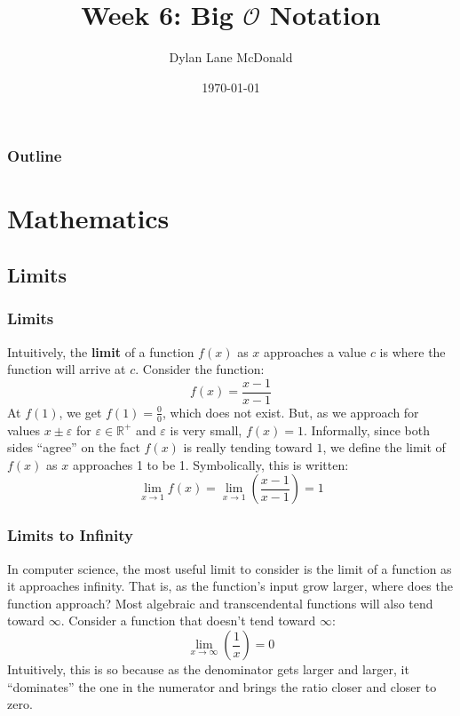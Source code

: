 \documentclass[aspectratio=169]{beamer}
\title{Week 6: Big $\mathcal{O}$ Notation}
\author{Dylan Lane McDonald}
\institute{CNM STEMulus Center\\Web Development with PHP}
\date{\today}
\begin{document}
\lstset{language=Java}
\begin{frame}
\titlepage
\end{frame}

\begin{frame}
\frametitle{Outline}
\tableofcontents
\end{frame}

\section{Mathematics}
\subsection{Limits}
\begin{frame}
\frametitle{Limits}
Intuitively, the \textbf{limit} of a function $f(x)$ as $x$ approaches a value $c$ is where the function will arrive at $c$. Consider the function:
\begin{equation}
f(x) = \frac {x - 1}{x - 1}
\label{eqn:ratio}
\end{equation}
At $f(1)$, we get $f(1) = \frac 00$, which does not exist. But, as we approach for values $x \pm \varepsilon$ for $\varepsilon \in \mathbb{R}^+$ and $\varepsilon$ is very small, $f(x) = 1$. Informally, since both sides ``agree'' on the fact $f(x)$ is really tending toward $1$, we define the limit of $f(x)$ as $x$ approaches 1 to be 1. Symbolically, this is written:
\[
\lim_{x \rightarrow 1} f(x) = \lim_{x \rightarrow 1} \left(\frac {x - 1}{x - 1}\right) = 1
\]
\end{frame}

\begin{frame}
\frametitle{Limits to Infinity}
In computer science, the most useful limit to consider is the limit of a function as it approaches infinity. That is, as the function's input grow larger, where does the function approach? Most algebraic and transcendental functions will also tend toward $\infty$. Consider a function that doesn't tend toward $\infty$:
\[
\lim_{x \rightarrow \infty} \left(\frac 1x\right) = 0
\]
Intuitively, this is so because as the denominator gets larger and larger, it ``dominates'' the one in the numerator and brings the ratio closer and closer to zero.
\end{frame}
\end{document}
